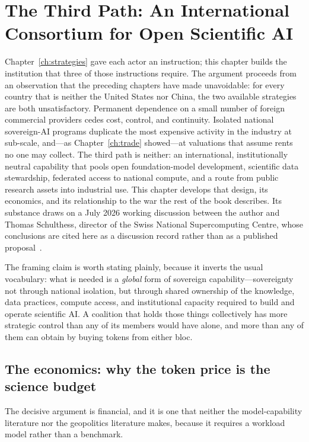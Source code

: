 \chapter{The Third Path: An International Consortium for Open Scientific AI}
\label{ch:consortium}

Chapter~\ref{ch:strategies} gave each actor an instruction; this chapter builds the institution that three of those instructions require. The argument proceeds from an observation that the preceding chapters have made unavoidable: for every country that is neither the United States nor China, the two available strategies are both unsatisfactory. Permanent dependence on a small number of foreign commercial providers cedes cost, control, and continuity. Isolated national sovereign-AI programs duplicate the most expensive activity in the industry at sub-scale, and---as Chapter~\ref{ch:trade} showed---at valuations that assume rents no one may collect. The third path is neither: an international, institutionally neutral capability that pools open foundation-model development, scientific data stewardship, federated access to national compute, and a route from public research assets into industrial use. This chapter develops that design, its economics, and its relationship to the war the rest of the book describes. Its substance draws on a July 2026 working discussion between the author and Thomas Schulthess, director of the Swiss National Supercomputing Centre, whose conclusions are cited here as a discussion record rather than as a published proposal~\cite{consortium-record}.

The framing claim is worth stating plainly, because it inverts the usual vocabulary: what is needed is a \emph{global} form of sovereign capability---sovereignty not through national isolation, but through shared ownership of the knowledge, data practices, compute access, and institutional capacity required to build and operate scientific AI. A coalition that holds those things collectively has more strategic control than any of its members would have alone, and more than any of them can obtain by buying tokens from either bloc.

\section{The economics: why the token price is the science budget}
\label{sec:ai4s-econ}

The decisive argument is financial, and it is one that neither the model-capability literature nor the geopolitics literature makes, because it requires a workload model rather than a benchmark.

